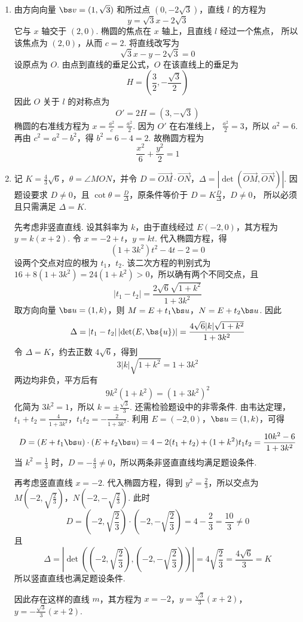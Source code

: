 \begin{solution}
\begin{enumerate}
\item 由方向向量 \(\bs v=(1,\sqrt3)\) 和所过点 \((0,-2\sqrt3)\)，直线 \(l\) 的方程为
\[
y=\sqrt3x-2\sqrt3
\]
它与 \(x\) 轴交于 \((2,0)\). 椭圆的焦点在 \(x\) 轴上，且直线 \(l\) 经过一个焦点，
所以该焦点为 \((2,0)\)，从而 \(c=2\). 将直线改写为
\[
\sqrt3x-y-2\sqrt3=0
\]
设原点为 \(O\). 由点到直线的垂足公式，\(O\) 在该直线上的垂足为
\[
H=\left(\frac{3}{2},-\frac{\sqrt3}{2}\right)
\]
因此 \(O\) 关于 \(l\) 的对称点为
\[
O'=2H=\left(3,-\sqrt3\right)
\]
椭圆的右准线方程为 \(x=\frac{a^2}{c}=\frac{a^2}{2}\). 因为 \(O'\) 在右准线上，
\(\frac{a^2}{2}=3\)，所以 \(a^2=6\). 再由 \(c^2=a^2-b^2\)，得
\(b^2=6-4=2\). 故椭圆方程为
\[
\frac{x^2}{6}+\frac{y^2}{2}=1
\]
\item 记 \(K=\frac{4}{3}\sqrt6\)，\(\theta=\angle MON\)，并令
\(D=\overrightarrow{OM}\cdot\overrightarrow{ON}\)，\(\Delta=\left|\det\left(\overrightarrow{OM},\overrightarrow{ON}\right)\right|\).
因题设要求 \(D\neq0\)，且
\(\cot\theta=\frac{D}{\Delta}\)，原条件等价于
\(D=K\frac{D}{\Delta}\)，\(D\neq0\)，
所以必须且只需满足 \(\Delta=K\).

先考虑非竖直直线. 设其斜率为 \(k\)，由于直线经过 \(E(-2,0)\)，其方程为
\(y=k(x+2)\). 令
\(x=-2+t\)，\(y=kt\).
代入椭圆方程，得
\[
(1+3k^2)t^2-4t-2=0
\]
设两个交点对应的根为 \(t_1\)，\(t_2\). 该二次方程的判别式为
\(16+8(1+3k^2)=24(1+k^2)>0\)，所以确有两个不同交点，且
\[
|t_1-t_2|=\frac{2\sqrt{6}\sqrt{1+k^2}}{1+3k^2}
\]
取方向向量 \(\bs u=(1,k)\)，则
\(M=E+t_1\bs u\)，\(N=E+t_2\bs u\). 因此
\[
\Delta=|t_1-t_2|\left|\det(E,\bs{u})\right|
=\frac{4\sqrt{6}|k|\sqrt{1+k^2}}{1+3k^2}
\]
令 \(\Delta=K\)，约去正数 \(4\sqrt6\)，得到
\[
3|k|\sqrt{1+k^2}=1+3k^2
\]
两边均非负，平方后有
\[
9k^2(1+k^2)=(1+3k^2)^2
\]
化简为 \(3k^2=1\)，所以
\(k=\pm\frac{\sqrt3}{3}\). 还需检验题设中的非零条件. 由韦达定理，
\(t_1+t_2=\frac{4}{1+3k^2}\)，\(t_1t_2=-\frac{2}{1+3k^2}\).
利用 \(E=(-2,0)\)，\(\bs u=(1,k)\)，可得
\[
D=\left(E+t_1\bs u\right)\cdot\left(E+t_2\bs u\right)
=4-2(t_1+t_2)+(1+k^2)t_1t_2
=\frac{10k^2-6}{1+3k^2}
\]
当 \(k^2=\frac13\) 时，\(D=-\frac43\neq0\)，所以两条非竖直直线均满足题设条件.

再考虑竖直直线 \(x=-2\). 代入椭圆方程，得到
\(y^2=\frac23\)，所以交点为
\(M\left(-2,\sqrt{\frac{2}{3}}\right)\)，\(N\left(-2,-\sqrt{\frac{2}{3}}\right)\).
此时
\[
D=\left(-2,\sqrt{\frac23}\right)\cdot
\left(-2,-\sqrt{\frac23}\right)
=4-\frac23=\frac{10}{3}\neq0
\]
且
\[
\Delta=\left|\det\left(
\left(-2,\sqrt{\frac23}\right),
\left(-2,-\sqrt{\frac23}\right)\right)\right|
=4\sqrt{\frac23}=\frac{4\sqrt6}{3}=K
\]
所以竖直直线也满足题设条件.

因此存在这样的直线 \(m\)，其方程为
\(x=-2\)，\(y=\frac{\sqrt3}{3}(x+2)\)，\(y=-\frac{\sqrt3}{3}(x+2)\).
\end{enumerate}
\end{solution}
